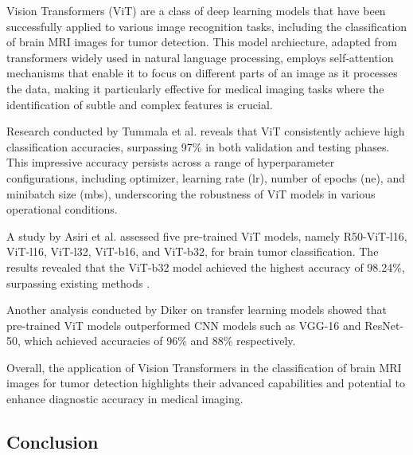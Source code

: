 Vision Transformers (ViT) are a class of deep learning models that have been successfully applied to various image recognition tasks, including the classification of brain MRI images for tumor detection. This model archiecture, adapted from transformers widely used in natural language processing, employs self-attention mechanisms that enable it to focus on different parts of an image as it processes the data, making it particularly effective for medical imaging tasks where the identification of subtle and complex features is crucial.

Research conducted by Tummala et al. \cite{Tummala2022} reveals that ViT consistently achieve high classification accuracies, surpassing 97\% in both validation and testing phases. This impressive accuracy persists across a range of hyperparameter configurations, including optimizer, learning rate (lr), number of epochs (ne), and minibatch size (mbs), underscoring the robustness of ViT models in various operational conditions.

A study by Asiri et al. assessed five pre-trained ViT models, namely R50-ViT-l16, ViT-l16, ViT-l32, ViT-b16, and ViT-b32, for brain tumor classification. The results revealed that the ViT-b32 model achieved the highest accuracy of 98.24\%, surpassing existing methods \cite{Asiri2023Advancing}. 

Another analysis conducted by Diker on transfer learning models showed that pre-trained ViT models outperformed CNN models such as VGG-16 and ResNet-50, which achieved accuracies of 96\% and 88\% respectively\cite{Diker2021A}.

Overall, the application of Vision Transformers in the classification of brain MRI images for tumor detection highlights their advanced capabilities and potential to enhance diagnostic accuracy in medical imaging.


\subsection{Conclusion}


